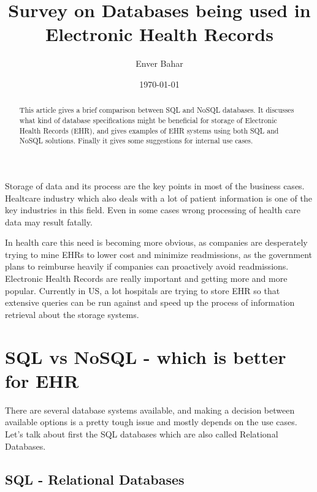 \documentclass{article}
\begin{document}
\title{Survey on Databases being used in Electronic Health Records}   %
\author{Enver Bahar}         %
\date{\today}    %
\maketitle

\begin{abstract}
This article gives a brief comparison between SQL and NoSQL databases. It discusses what kind of database specifications might be beneficial for storage of Electronic Health Records (EHR), and gives examples of EHR systems using both SQL and NoSQL solutions. Finally it gives some suggestions for internal use cases. \\
\end{abstract} 

Storage of data and its process are the key points in most of the business cases.  Healtcare industry which also deals with a lot of patient information is one of the key industries in this field. 
Even in some cases wrong processing of health care data  may result fatally.
 
In health care this need is becoming more obvious, as companies are desperately trying to mine EHRs to lower cost and minimize readmissions, as the government plans to reimburse heavily if companies can proactively avoid readmissions. Electronic Health Records are really important and getting more and more popular. Currently in US, a lot hospitals are trying to store EHR so that extensive queries can be run against and speed up the process of information retrieval about the storage systems. 

\section{SQL vs NoSQL - which is better for EHR}

There are several database systems available, and making a decision between available options is a pretty tough issue and mostly depends on the use cases. Let's talk about first the SQL databases which are also called Relational Databases. 

\subsection{SQL - Relational Databases}

\end{document}
